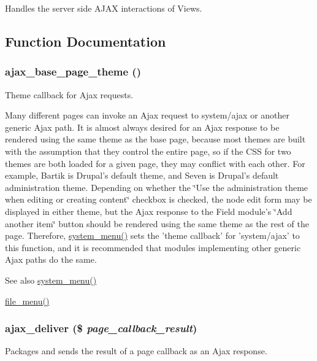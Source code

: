 Handles the server side AJAX interactions of Views. 

\subsection{Function Documentation}
\hypertarget{group__ajax_ga9d02bfeb3c0e9c3aa36c7f7645a042eb}{
\subsubsection[{ajax\_\-base\_\-page\_\-theme}]{\setlength{\rightskip}{0pt plus 5cm}ajax\_\-base\_\-page\_\-theme ()}}
\label{group__ajax_ga9d02bfeb3c0e9c3aa36c7f7645a042eb}
Theme callback for Ajax requests.

Many different pages can invoke an Ajax request to system/ajax or another generic Ajax path. It is almost always desired for an Ajax response to be rendered using the same theme as the base page, because most themes are built with the assumption that they control the entire page, so if the CSS for two themes are both loaded for a given page, they may conflict with each other. For example, Bartik is Drupal's default theme, and Seven is Drupal's default administration theme. Depending on whether the \char`\"{}Use the administration theme
 when editing or creating content\char`\"{} checkbox is checked, the node edit form may be displayed in either theme, but the Ajax response to the Field module's \char`\"{}Add another item\char`\"{} button should be rendered using the same theme as the rest of the page. Therefore, \hyperlink{system_8module_ae25cda0ea4fd63936e8f955dd9cfc269}{system\_\-menu()} sets the 'theme callback' for 'system/ajax' to this function, and it is recommended that modules implementing other generic Ajax paths do the same.

\begin{DoxySeeAlso}{See also}
\hyperlink{system_8module_ae25cda0ea4fd63936e8f955dd9cfc269}{system\_\-menu()} 

\hyperlink{file_8module_acf2d37bd1c1db6d3b8632a615bd40226}{file\_\-menu()} 
\end{DoxySeeAlso}
\hypertarget{group__ajax_ga44a56b3660e97b39f87535a9a2bc8d8a}{
\subsubsection[{ajax\_\-deliver}]{\setlength{\rightskip}{0pt plus 5cm}ajax\_\-deliver (\$ {\em page\_\-callback\_\-result})}}
\label{group__ajax_ga44a56b3660e97b39f87535a9a2bc8d8a}
Packages and sends the result of a page callback as an Ajax response.

